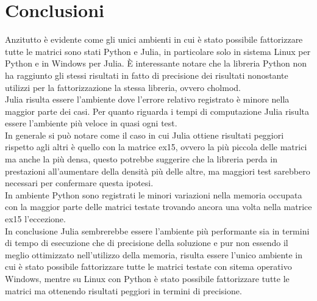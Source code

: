 \documentclass{report}
\begin{document}
    \chapter{Conclusioni}
        Anzitutto è evidente come gli unici ambienti in cui è stato possibile fattorizzare tutte le matrici sono 
        stati Python e Julia, in particolare solo in sistema Linux per Python e in Windows per Julia. 
        \`E interessante notare che la libreria Python non ha raggiunto gli stessi risultati in fatto di precisione
        dei risultati nonostante utilizzi per la fattorizzazione la stessa libreria, ovvero cholmod.\\
        Julia risulta essere l'ambiente dove l'errore relativo registrato è minore nella maggior parte 
        dei casi. 
        Per quanto riguarda i tempi di computazione Julia risulta essere l'ambiente più veloce in quasi ogni test.\\
        In generale si può notare come il caso in cui Julia ottiene risultati peggiori rispetto agli altri è quello 
        con la matrice ex15, ovvero la più piccola delle matrici ma anche la più densa, questo potrebbe suggerire 
        che la libreria perda in prestazioni all'aumentare della densità più delle altre, ma maggiori test sarebbero
        necessari per confermare questa ipotesi.\\
        In ambiente Python sono registrati le minori variazioni nella memoria occupata con la maggior parte delle
        matrici testate trovando ancora una volta nella matrice ex15 l'eccezione.\\
        In conclusione Julia sembrerebbe essere l'ambiente più performante sia in termini di tempo di esecuzione che
        di precisione della soluzione e pur non essendo il meglio ottimizzato nell'utilizzo della memoria, risulta
        essere l'unico ambiente in cui è stato possibile fattorizzare tutte le matrici testate con sitema operativo
        Windows, mentre su Linux con Python è stato possibile fattorizzare tutte le matrici ma ottenendo risultati
        peggiori in termini di precisione.

            
                
\end{document}
